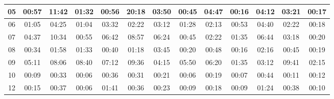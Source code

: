 \begin{center}
\begin{sideways}
\begin{tabular}{|l|l|l|l|l|l|l|l|l|l|l|l|l|}
\hline
\multicolumn{1}{|c|}{05} & \multicolumn{1}{c|}{00:57} & \multicolumn{1}{c|}{11:42} & \multicolumn{1}{c|}{01:32} & \multicolumn{1}{c|}{00:56} & \multicolumn{1}{c|}{20:18} & \multicolumn{1}{c|}{03:50} & \multicolumn{1}{c|}{00:45} & \multicolumn{1}{c|}{04:47} & \multicolumn{1}{c|}{00:16} & \multicolumn{1}{c|}{04:12} & \multicolumn{1}{c|}{03:21} & \multicolumn{1}{c|}{00:17} \\ 
\hline
\multicolumn{1}{|c|}{06} & \multicolumn{1}{c|}{01:05} & \multicolumn{1}{c|}{04:25} & \multicolumn{1}{c|}{01:04} & \multicolumn{1}{c|}{03:32} & \multicolumn{1}{c|}{02:22} & \multicolumn{1}{c|}{03:12} & \multicolumn{1}{c|}{01:28} & \multicolumn{1}{c|}{02:13} & \multicolumn{1}{c|}{00:53} & \multicolumn{1}{c|}{04:40} & \multicolumn{1}{c|}{02:22} & \multicolumn{1}{c|}{00:18} \\ 
\hline
\multicolumn{1}{|c|}{07} & \multicolumn{1}{c|}{04:37} & \multicolumn{1}{c|}{10:34} & \multicolumn{1}{c|}{00:55} & \multicolumn{1}{c|}{06:42} & \multicolumn{1}{c|}{08:57} & \multicolumn{1}{c|}{06:24} & \multicolumn{1}{c|}{00:45} & \multicolumn{1}{c|}{02:22} & \multicolumn{1}{c|}{01:35} & \multicolumn{1}{c|}{06:44} & \multicolumn{1}{c|}{03:18} & \multicolumn{1}{c|}{00:20} \\ 
\hline
\multicolumn{1}{|c|}{08} & \multicolumn{1}{c|}{00:34} & \multicolumn{1}{c|}{01:58} & \multicolumn{1}{c|}{01:33} & \multicolumn{1}{c|}{00:40} & \multicolumn{1}{c|}{01:18} & \multicolumn{1}{c|}{03:45} & \multicolumn{1}{c|}{00:20} & \multicolumn{1}{c|}{00:48} & \multicolumn{1}{c|}{00:16} & \multicolumn{1}{c|}{02:16} & \multicolumn{1}{c|}{00:45} & \multicolumn{1}{c|}{00:19} \\ 
\hline
\multicolumn{1}{|c|}{09} & \multicolumn{1}{c|}{05:11} & \multicolumn{1}{c|}{08:06} & \multicolumn{1}{c|}{08:40} & \multicolumn{1}{c|}{07:12} & \multicolumn{1}{c|}{09:36} & \multicolumn{1}{c|}{04:15} & \multicolumn{1}{c|}{05:50} & \multicolumn{1}{c|}{06:20} & \multicolumn{1}{c|}{01:35} & \multicolumn{1}{c|}{03:12} & \multicolumn{1}{c|}{09:41} & \multicolumn{1}{c|}{02:15} \\ 
\hline
\multicolumn{1}{|c|}{10} & \multicolumn{1}{c|}{00:09} & \multicolumn{1}{c|}{00:33} & \multicolumn{1}{c|}{00:06} & \multicolumn{1}{c|}{00:36} & \multicolumn{1}{c|}{00:31} & \multicolumn{1}{c|}{00:21} & \multicolumn{1}{c|}{00:06} & \multicolumn{1}{c|}{00:19} & \multicolumn{1}{c|}{00:07} & \multicolumn{1}{c|}{00:44} & \multicolumn{1}{c|}{00:11} & \multicolumn{1}{c|}{00:12} \\ 
\hline
\multicolumn{1}{|c|}{12} & \multicolumn{1}{c|}{00:15} & \multicolumn{1}{c|}{00:37} & \multicolumn{1}{c|}{00:06} & \multicolumn{1}{c|}{01:41} & \multicolumn{1}{c|}{00:36} & \multicolumn{1}{c|}{00:23} & \multicolumn{1}{c|}{00:09} & \multicolumn{1}{c|}{00:18} & \multicolumn{1}{c|}{00:09} & \multicolumn{1}{c|}{01:24} & \multicolumn{1}{c|}{00:38} & \multicolumn{1}{c|}{00:10} \\ 

\end{tabular}
\end{sideways}
\end{center}
